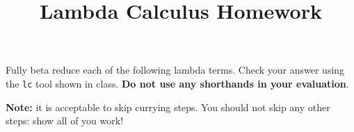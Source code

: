 \documentclass{exam}
\title{Lambda Calculus Homework}
\author{}
\begin{document}
\maketitle
\thispagestyle{foot}

\begin{questions}
    \question[50]
        Fully beta reduce each of the following lambda terms. Check your
        answer using the \texttt{lc} tool shown in class. \textbf{Do not use
        any shorthands in your evaluation}.

        \textbf{Note:} it is acceptable to skip currying steps. You should not
        skip any other steps: show all of you work!

\end{questions}
\end{document}
